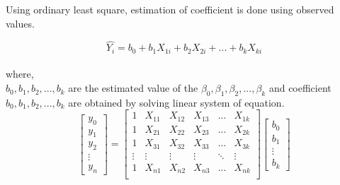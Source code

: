 \documentclass[preprint,12pt]{elsarticle}
\begin{document}
				  Using ordinary least square, estimation of coefficient is done using observed values.
				  
				   \begin{equation}
				   \hat{Y_i} = b_0 + b_1  X_{1i} +  b_2  X_{2i} + ... +  b_k  X_{ki} 
				   \end{equation}\\
				   where,\\
				   $ b_0 ,b_1 ,  b_2 , ... ,  b_k $ are the estimated value of  the $\beta_0 , \beta_1  ,  \beta_2 , ... , \beta_k$ and coefficient $ b_0 ,b_1 ,  b_2 , ... ,  b_k $ are obtained by solving linear system of equation.\\
					\[
				   \begin{bmatrix}
						y_0 \\
						y_1 \\
						y_2 \\
						\vdots\\
						y_n
				   \end{bmatrix}
				   =
				     \begin{bmatrix}
				    1 & X_{11} &  X_{12}  & X_{13} & ... &  X_{1k}\\ 
				    1 & X_{21} &  X_{22}  & X_{23} & ... &  X_{2k}\\ 
				    1 & X_{31} &  X_{32}  & X_{33} & ... &  X_{3k}\\ 
   				    \vdots & \vdots &  \vdots  & \vdots & \ddots &  \vdots\\ 
				    1 & X_{n1} &  X_{n2}  & X_{n3} & ... &  X_{nk}\\ 			    				    				    
				     \end{bmatrix}
				      \begin{bmatrix}
				      b_0 \\
				      b_1  \\
				      \vdots\\
				      b_k 
				      \end{bmatrix}
				    \]
				   			
\end{document}

